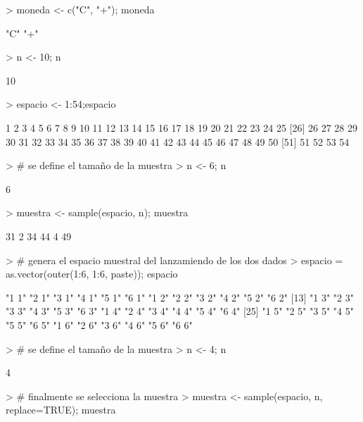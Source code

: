 \documentclass{article}
\begin{document}
\begin{Schunk}
\begin{Sinput}
> moneda <- c("C", "+"); moneda
\end{Sinput}
\begin{Soutput}
[1] "C" "+"
\end{Soutput}
\begin{Sinput}
> n <- 10; n
\end{Sinput}
\begin{Soutput}
[1] 10
\end{Soutput}
\begin{Sinput}
> espacio <- 1:54;espacio
\end{Sinput}
\begin{Soutput}
 [1]  1  2  3  4  5  6  7  8  9 10 11 12 13 14 15 16 17 18 19 20 21 22 23 24 25
[26] 26 27 28 29 30 31 32 33 34 35 36 37 38 39 40 41 42 43 44 45 46 47 48 49 50
[51] 51 52 53 54
\end{Soutput}
\begin{Sinput}
> # se define el tamaño de la muestra
> n <- 6; n
\end{Sinput}
\begin{Soutput}
[1] 6
\end{Soutput}
\begin{Sinput}
> muestra <- sample(espacio, n); muestra
\end{Sinput}
\begin{Soutput}
[1] 31  2 34 44  4 49
\end{Soutput}
\begin{Sinput}
> # genera el espacio muestral del lanzamiendo de los dos dados
> espacio = as.vector(outer(1:6, 1:6, paste)); espacio
\end{Sinput}
\begin{Soutput}
 [1] "1 1" "2 1" "3 1" "4 1" "5 1" "6 1" "1 2" "2 2" "3 2" "4 2" "5 2" "6 2"
[13] "1 3" "2 3" "3 3" "4 3" "5 3" "6 3" "1 4" "2 4" "3 4" "4 4" "5 4" "6 4"
[25] "1 5" "2 5" "3 5" "4 5" "5 5" "6 5" "1 6" "2 6" "3 6" "4 6" "5 6" "6 6"
\end{Soutput}
\begin{Sinput}
> # se define el tamaño de la muestra
> n <- 4; n
\end{Sinput}
\begin{Soutput}
[1] 4
\end{Soutput}
\begin{Sinput}
> # finalmente se selecciona la muestra
> muestra <- sample(espacio, n, replace=TRUE); muestra
\end{Sinput}
\begin{Soutput}

\end{Soutput}
\end{Schunk}
\end{document}

